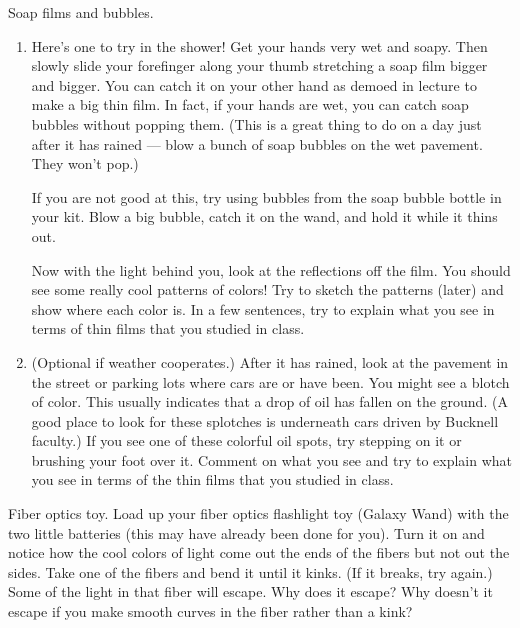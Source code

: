 \begin{aproblem}{Soap films and bubbles.} 
  \begin{enumerate} 
  \item Here's one to try in the shower! Get your hands very wet and
    soapy. Then slowly slide your forefinger along your thumb
    stretching a soap film bigger and bigger.  You can catch it on
    your other hand as demoed in lecture to make a big thin film.  In
    fact, if your hands are wet, you can catch soap bubbles without
    popping them. (This is a great thing to do on a day just after it
    has rained --- blow a bunch of soap bubbles on the wet pavement.
    They won't pop.)

    If you are not good at this, try using bubbles from the soap
    bubble bottle in your kit.  Blow a big bubble, catch it on the
    wand, and hold it while it thins out.

    Now with the light behind you, look at the reflections off the
    film. You should see some really cool patterns of colors!  Try to
    sketch the patterns (later) and show where each color is.  In a
    few sentences, try to explain what you see in terms of thin films
    that you studied in class.

  \item (Optional if weather cooperates.)  After it has rained, look
    at the pavement in the street or parking lots where cars are or
    have been.  You might see a blotch of color.  This usually
    indicates that a drop of oil has fallen on the ground.  (A good
    place to look for these splotches is underneath cars driven by
    Bucknell faculty.) If you see one of these colorful oil spots, try
    stepping on it or brushing your foot over it.  Comment on what you
    see and try to explain what you see in terms of the thin films
    that you studied in class.
  \end{enumerate}
\end{aproblem}


\begin{aproblem}{Fiber optics toy.} 
  Load up your fiber optics flashlight toy (Galaxy Wand) with the two
  little batteries (this may have already been done for you). Turn it
  on and notice how the cool colors of light come out the ends of the
  fibers but not out the sides.  Take one of the fibers and bend it
  until it kinks. (If it breaks, try again.)  Some of the light in
  that fiber will escape.  Why does it escape?  Why doesn't it escape
  if you make smooth curves in the fiber rather than a kink?
\end{aproblem}



